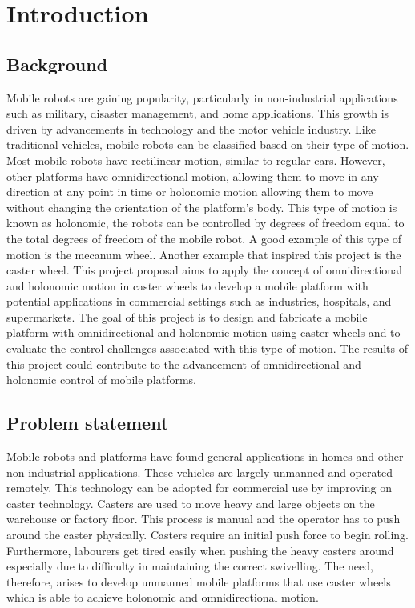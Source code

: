 \section{Introduction}
\label{sec:introduction}
\subsection{Background}

Mobile robots are gaining popularity, particularly in non-industrial applications such as military, disaster management, and home applications. This growth is driven by advancements in technology and the motor vehicle industry. Like traditional vehicles, mobile robots can be classified based on their type of motion. Most mobile robots have rectilinear motion, similar to regular cars. However, other platforms have omnidirectional motion, allowing them to move in any direction at any point in time or holonomic motion allowing them to move without changing the orientation of the platform's body. This type of motion is known as holonomic, the robots can be controlled by degrees of freedom equal to the total degrees of freedom of the mobile robot. A good example of this type of motion is the mecanum wheel. Another example that inspired this project is the caster wheel. This project proposal aims to apply the concept of omnidirectional and holonomic motion in caster wheels to develop a mobile platform with potential applications in commercial settings such as industries, hospitals, and supermarkets. The goal of this project is to design and fabricate a mobile platform with omnidirectional and holonomic motion using caster wheels and to evaluate the control challenges associated with this type of motion. The results of this project could contribute to the advancement of omnidirectional and holonomic control of mobile platforms.

\subsection{Problem statement}
Mobile robots and platforms have found general applications in homes and other non-industrial applications. These vehicles are largely unmanned and operated remotely. This technology can be adopted for commercial use by improving on caster technology. Casters are used to move heavy and large objects on the warehouse or factory floor. This process is manual and the operator has to push around the caster physically. Casters require an initial push force to begin rolling. Furthermore, labourers get tired easily when pushing the heavy casters around especially due to difficulty in maintaining the correct swivelling. The need, therefore, arises to develop unmanned mobile platforms that use caster wheels which is able to achieve holonomic and omnidirectional motion.

